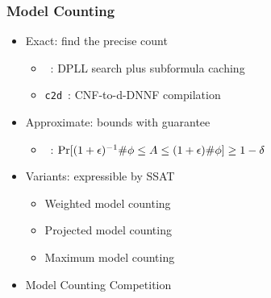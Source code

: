\begin{frame}
    \frametitle{Model Counting}
    \begin{itemize}
        \item Exact: find the precise count
              \pause
              \begin{itemize}
                  \item \cachet~\cite{Sang2004,Sang2005ModelCounting}: DPLL search plus subformula caching
                        \pause
                  \item \texttt{c2d}~\cite{Darwiche2001,Darwiche2002dDNNF}: CNF-to-d-DNNF compilation
                        \pause
              \end{itemize}
        \item Approximate: bounds with guarantee
              \pause
              \begin{itemize}
                  \item \approxmc~\cite{Chakraborty2013,Chakraborty2016}: $\Pr[(1+\epsilon)^{-1}\#\phi \leq A \leq (1+\epsilon)\#\phi] \geq 1-\delta$
                        \pause
              \end{itemize}
        \item Variants: expressible by SSAT
              \pause
              \begin{itemize}
                  \item Weighted model counting~\cite{Sang2005BayesianInference,Chavira2008}
                        \pause
                  \item Projected model counting~\cite{Aziz2015}
                        \pause
                  \item Maximum model counting~\cite{Fremont2017}
                        \pause
              \end{itemize}
        \item Model Counting Competition~\cite{MC-COMP2020}
    \end{itemize}
\end{frame}